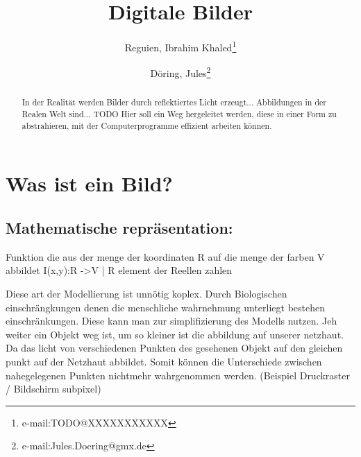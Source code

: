 \documentclass[tog]{acmsiggraph}
\title{Digitale Bilder}
\author{Reguien, Ibrahim Khaled\thanks{e-mail:TODO@XXXXXXXXXXX}
\and Döring, Jules\thanks{e-mail:Jules.Doering@gmx.de}}
\begin{document}


\maketitle



\begin{abstract}
In der Realität werden Bilder durch reflektiertes Licht erzeugt...
Abbildungen in der Realen Welt sind... TODO
Hier soll ein Weg hergeleitet werden, diese in einer Form zu abstrahieren, mit der Computerprogramme effizient arbeiten können.
\end{abstract}

\section{Was ist ein Bild?}

\subsection{Mathematische repräsentation:}
Funktion die aus der menge der koordinaten R auf die menge der farben V abbildet
I(x,y):R ->V | R element der Reellen zahlen

Diese art der Modellierung ist unnötig koplex. Durch Biologischen einschrängkungen denen die menschliche wahrnehmung unterliegt bestehen einschränkungen. Diese kann man zur simplifizierung des Modells nutzen.
Jeh weiter ein Objekt weg ist, um so kleiner ist die abbildung auf unserer netzhaut. Da das licht von verschiedenen Punkten des gesehenen Objekt auf den gleichen punkt auf der Netzhaut abbildet. Somit können die Unterschiede zwischen nahegelegenen Punkten nichtmehr wahrgenommen werden. (Beispiel Druckraster / Bildschirm subpixel)
\end{document}
